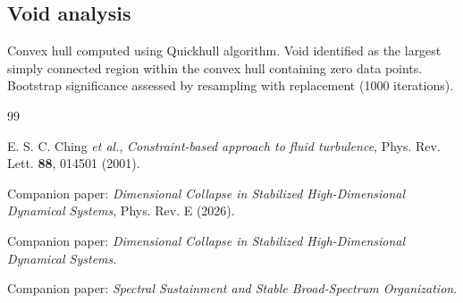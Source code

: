 \documentclass{chaos-article}
\begin{document}
\subsection{Void analysis}

Convex hull computed using Quickhull algorithm. Void identified as the largest simply connected region within the convex hull containing zero data points. Bootstrap significance assessed by resampling with replacement (1000 iterations).

\begin{thebibliography}{99}

E. S. C. Ching \textit{et al.}, \textit{Constraint-based approach to fluid turbulence}, Phys. Rev. Lett. \textbf{88}, 014501 (2001).

Companion paper: \textit{Dimensional Collapse in Stabilized High-Dimensional Dynamical Systems}, Phys. Rev. E (2026).

Companion paper: \textit{Dimensional Collapse in Stabilized High-Dimensional Dynamical Systems}.

Companion paper: \textit{Spectral Sustainment and Stable Broad-Spectrum Organization}.

\end{thebibliography}
\end{document}
